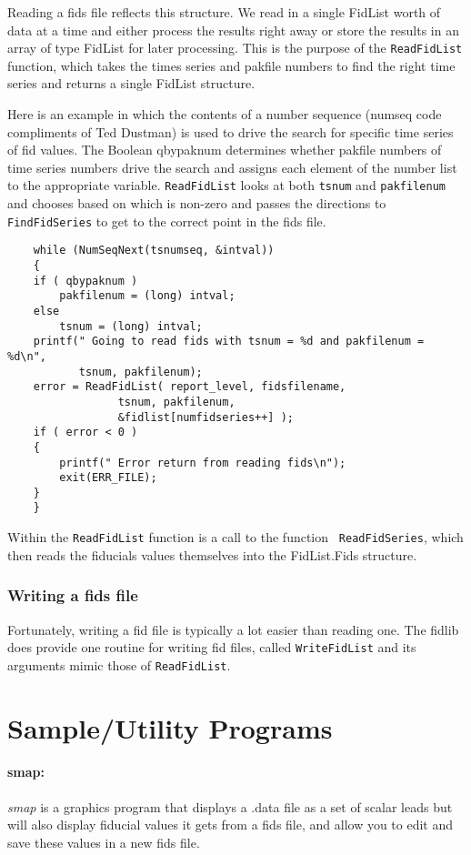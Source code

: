 \documentclass[11pt]{article}
\begin{document}
Reading a fids file reflects this structure.  We read in a single FidList
worth of data at a time and either process the results right away or store
the results in an array of type FidList for later processing.  This is the
purpose of the {\tt ReadFidList} function, which takes the times series and
pakfile numbers to find the right time series and returns a single FidList
structure.  

Here is an example in which the contents of a number sequence (numseq code
compliments of Ted Dustman) is used to drive the search for specific time
series of fid values.  The Boolean qbypaknum determines whether pakfile
numbers of time series numbers drive the search and assigns each element of
the number list to the appropriate variable.  {\tt ReadFidList} looks at
both {\tt tsnum} and {\tt pakfilenum} and chooses based on which is
non-zero and passes the directions to {\tt FindFidSeries} to get to the
correct point in the fids file.
%
\begin{verbatim}
    while (NumSeqNext(tsnumseq, &intval))
    {
	if ( qbypaknum )
	    pakfilenum = (long) intval;
	else
	    tsnum = (long) intval;
	printf(" Going to read fids with tsnum = %d and pakfilenum = %d\n",
	       tsnum, pakfilenum);
	error = ReadFidList( report_level, fidsfilename,
			     tsnum, pakfilenum, 
			     &fidlist[numfidseries++] );
	if ( error < 0 )
	{
	    printf(" Error return from reading fids\n");
	    exit(ERR_FILE);
	}
    }
\end{verbatim}

Within the {\tt ReadFidList} function is a call to the function {\tt
ReadFidSeries}, which then reads the fiducials values themselves into the
FidList.Fids structure.

\subsubsection{Writing a fids file}

Fortunately, writing a fid file is typically a lot easier than reading
one.  The fidlib does provide one routine for writing fid files, called
{\tt WriteFidList} and its arguments mimic those of {\tt ReadFidList}.

\section{Sample/Utility Programs}

\paragraph{smap: }  {\em smap\/} is a graphics program that displays a
.data file as a set of scalar leads but will also display fiducial values
it gets from a fids file, and allow you to edit and save these values in a
new fids file.
\end{document}
